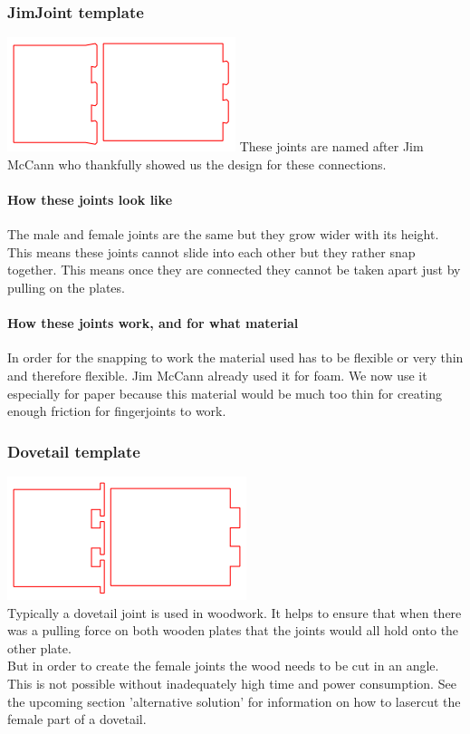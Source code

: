\documentclass[../ClassicThesis.tex]{subfiles}
\begin{document}
\subsubsection{JimJoint template}
    \includegraphics[width=0.5\columnwidth]{Images/jimjoints.png}
    These joints are named after Jim McCann who thankfully showed us the design for these connections.
    \paragraph{How these joints look like}
    The male and female joints are the same but they grow wider with its height. This means these joints cannot slide into each other but they rather snap together. This means once they are connected they cannot be taken apart just by pulling on the plates. 
    \paragraph{How these joints work, and for what material}
    In order for the snapping to work the material used has to be flexible or very thin and therefore flexible. Jim McCann already used it for foam. We now use it especially for paper because this material would be much too thin for creating enough friction for fingerjoints to work.

\subsubsection{Dovetail template}
    \includegraphics[width=0.5\columnwidth]{Images/schwalbe.png}
    \\
    Typically a dovetail joint is used in woodwork. It helps to ensure that when there was a pulling force on both wooden plates that the joints would all hold onto the other plate.\\
    But in order to create the female joints the wood needs to be cut in an angle. This is not possible without inadequately high time and power consumption. See the upcoming section 'alternative solution' for information on how to lasercut the female part of a dovetail.
\end{document}
